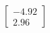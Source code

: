 \documentclass[preview]{standalone}
\begin{document}
\begin{align*}
\begin{bmatrix} -4.92 \\ 2.96 \end{bmatrix}
\end{align*}
\end{document}
